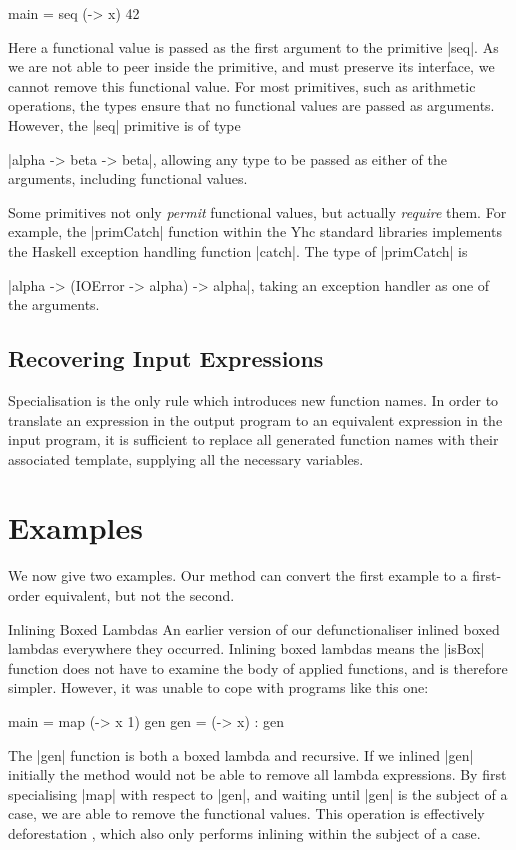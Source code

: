 \documentclass[preprint]{sigplanconf}
\begin{document}
\begin{example}
\begin{code}
main = seq (\x -> x) 42
\end{code}

Here a functional value is passed as the first argument to the primitive |seq|. As we are not able to peer inside the primitive, and must preserve its interface, we cannot remove this functional value. For most primitives, such as arithmetic operations, the types ensure that no functional values are passed as arguments. However, the |seq| primitive is of type \ignore|alpha -> beta -> beta|, allowing any type to be passed as either of the arguments, including functional values.

Some primitives not only \textit{permit} functional values, but actually \textit{require} them. For example, the |primCatch| function within the Yhc standard libraries implements the Haskell exception handling function |catch|. The type of |primCatch| is \ignore|alpha -> (IOError -> alpha) -> alpha|, taking an exception handler as one of the arguments.
\end{example}

\subsection{Recovering Input Expressions}
\label{sec:recover}

Specialisation is the only rule which introduces new function names. In order to translate an expression in the output program to an equivalent expression in the input program, it is sufficient to replace all generated function names with their associated template, supplying all the necessary variables.

\section{Examples}
\label{sec:examples}

We now give two examples. Our method can convert the first example to a first-order equivalent, but not the second.

\begin{examplename}{Inlining Boxed Lambdas}
\label{ex:inlining_boxed_lambdas}
An earlier version of our defunctionaliser inlined boxed lambdas everywhere they occurred. Inlining boxed lambdas means the |isBox| function does not have to examine the body of applied functions, and is therefore simpler. However, it was unable to cope with programs like this one:

\begin{code}
main = map (\x -> x 1) gen
gen = (\x -> x) : gen
\end{code}

The |gen| function is both a boxed lambda and recursive. If we inlined |gen| initially the method would not be able to remove all lambda expressions. By first specialising |map| with respect to |gen|, and waiting until |gen| is the subject of a case, we are able to remove the functional values. This operation is effectively deforestation \cite{wadler:deforestation}, which also only performs inlining within the subject of a case.
\end{examplename}
\end{document}
